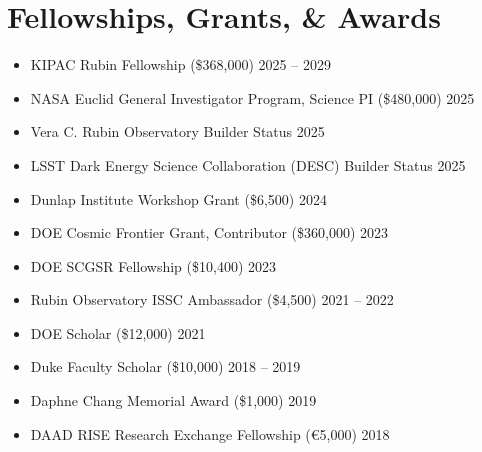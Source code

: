 \section{Fellowships, Grants, \& Awards}
\begin{itemize}
    \item KIPAC Rubin Fellowship (\$368,000) \hfill 2025 -- 2029
    \item NASA Euclid General Investigator Program, Science PI (\$480,000) \hfill 2025
    \item Vera C. Rubin Observatory Builder Status \hfill 2025
    \item LSST Dark Energy Science Collaboration (DESC) Builder Status \hfill 2025
    \item Dunlap Institute Workshop Grant (\$6,500) \hfill 2024
    \item DOE Cosmic Frontier Grant, Contributor (\$360,000) \hfill 2023
    \item DOE SCGSR Fellowship (\$10,400) \hfill 2023
    \item Rubin Observatory ISSC Ambassador (\$4,500) \hfill 2021 -- 2022
    \item DOE Scholar (\$12,000) \hfill 2021
    \item Duke Faculty Scholar (\$10,000) \hfill 2018 -- 2019
    \item Daphne Chang Memorial Award (\$1,000) \hfill 2019
    \item DAAD RISE Research Exchange Fellowship (\euro{5,000}) \hfill 2018
\end{itemize}